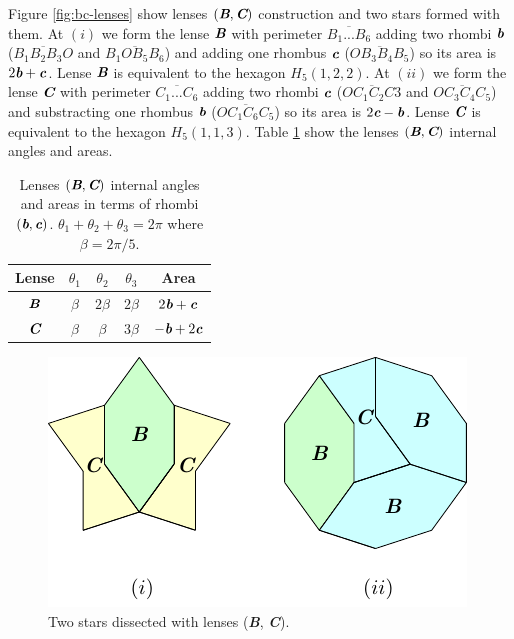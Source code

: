 \documentclass[11pt]{article}
\def\mathbi#1{\textbf{\em #1}}
\begin{document}
Figure \ref{fig:bc-lenses} show lenses $(\mathbi{B},\mathbi{C})$ construction and two stars formed with them.
At $(i)$ we form the lense $\mathbi{B}$ with perimeter $\overline{B_1...B_6}$ adding two rhombi $\mathbi{b}$ ($\overline{B_1B_2B_3O}$ and $\overline{B_1OB_5B_6}$) and adding one rhombus $\mathbi{c}$ ($\overline{OB_3B_4B_5}$) so its area is $2\mathbi{b} + \mathbi{c}$. Lense $\mathbi{B}$ is equivalent to the hexagon $H_5(1,2,2)$.
At $(ii)$ we form the lense $\mathbi{C}$ with perimeter $\overline{C_1...C_6}$ adding two rhombi $\mathbi{c}$ ($\overline{OC_1C_2C3}$ and $\overline{OC_3C_4C_5}$) and substracting one rhombus $\mathbi{b}$ ($\overline{OC_1C_6C_5}$) so its area is $2\mathbi{c} - \mathbi{b}$. Lense $\mathbi{C}$ is equivalent to the hexagon $H_5(1,1,3)$.
Table \ref{tbl:bc-lenses-angles} show the lenses $(\mathbi{B},\mathbi{C})$ internal angles and areas.

\begin{table}[H]
\begin{center}
\begin{tabular}{|c|c c c| c |} \hline
Lense & $\theta_1$ & $\theta_2$ & $\theta_3$ & Area \\ \hline
$\mathbi{B}$ & $\beta$ & $2\beta$ & $2\beta$ & $2\mathbi{b} + \mathbi{c}$
\\[0.5ex] \hline
$\mathbi{C}$ & $\beta$ & $\beta$ & $3\beta$ & $- \mathbi{b} + 2\mathbi{c}$
\\[0.5ex] \hline
\end{tabular}
\caption{Lenses $(\mathbi{B},\mathbi{C})$ internal angles and areas in terms of rhombi $(\mathbi{b},\mathbi{c})$. $\theta_1+\theta_2+\theta_3 = 2\pi$ where $\beta = 2\pi/5$.} 
\label{tbl:bc-lenses-angles}
\end{center}
\end{table}



\begin{figure}[H]
\centering
\includegraphics[scale=1.1]{bc/bc-stars-2}
\caption{Two stars dissected with lenses (\mathbi{B}, \mathbi{C}).}
\label{fig:bc-stars-2}
\end{figure}
\end{document}
